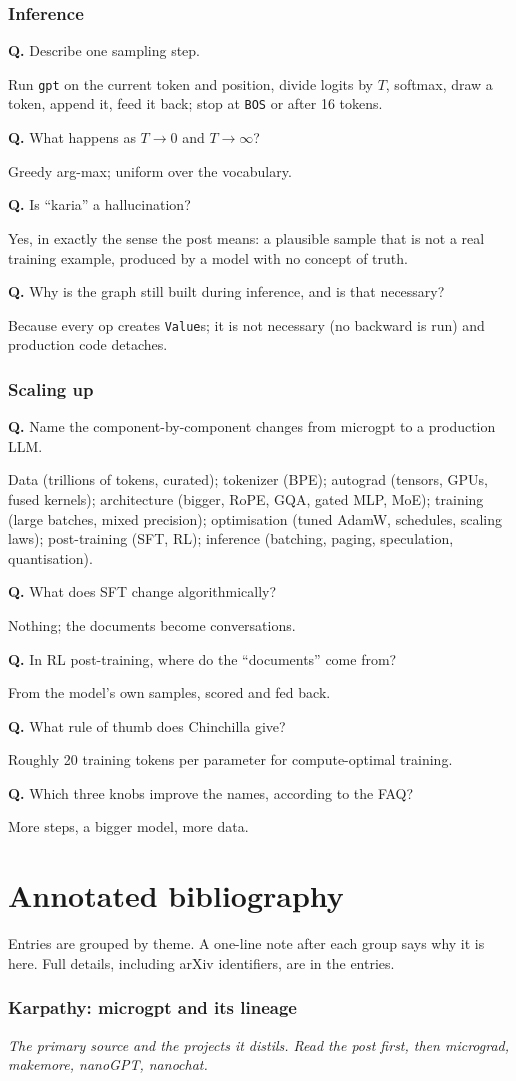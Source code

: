 \documentclass[10pt,letterpaper]{article}
\newcommand{\code}[1]{\lstinline[basicstyle=\ttfamily\small]|#1|}
\newcommand{\BOS}{\texttt{BOS}}
\newcounter{q}
\newcommand{\Q}[2]{\stepcounter{q}\par\noindent\textbf{Q\theq.} #1\par\noindent{\color{accent2}\textit{A.}} #2\par\medskip}
\begin{document}
\section{Inference}
\Q{Describe one sampling step.}{Run \code{gpt} on the current token and position, divide logits by $T$, softmax, draw a token, append it, feed it back; stop at \BOS{} or after 16 tokens.}
\Q{What happens as $T\to 0$ and $T\to\infty$?}{Greedy arg-max; uniform over the vocabulary.}
\Q{Is ``karia'' a hallucination?}{Yes, in exactly the sense the post means: a plausible sample that is not a real training example, produced by a model with no concept of truth.}
\Q{Why is the graph still built during inference, and is that necessary?}{Because every op creates \code{Value}s; it is not necessary (no backward is run) and production code detaches.}

\section{Scaling up}
\Q{Name the component-by-component changes from microgpt to a production LLM.}{Data (trillions of tokens, curated); tokenizer (BPE); autograd (tensors, GPUs, fused kernels); architecture (bigger, RoPE, GQA, gated MLP, MoE); training (large batches, mixed precision); optimisation (tuned AdamW, schedules, scaling laws); post-training (SFT, RL); inference (batching, paging, speculation, quantisation).}
\Q{What does SFT change algorithmically?}{Nothing; the documents become conversations.}
\Q{In RL post-training, where do the ``documents'' come from?}{From the model's own samples, scored and fed back.}
\Q{What rule of thumb does Chinchilla give?}{Roughly 20 training tokens per parameter for compute-optimal training.}
\Q{Which three knobs improve the names, according to the FAQ?}{More steps, a bigger model, more data.}

\clearpage
\part{Annotated bibliography}
\label{part:bib}

\nocite{*}
Entries are grouped by theme. A one-line note after each group says why it is here. Full details, including arXiv identifiers, are in the entries.

\section*{Karpathy: microgpt and its lineage}
\emph{The primary source and the projects it distils. Read the post first, then micrograd, makemore, nanoGPT, nanochat.}
\printbibliography[heading=none,keyword=karpathy]
\end{document}
